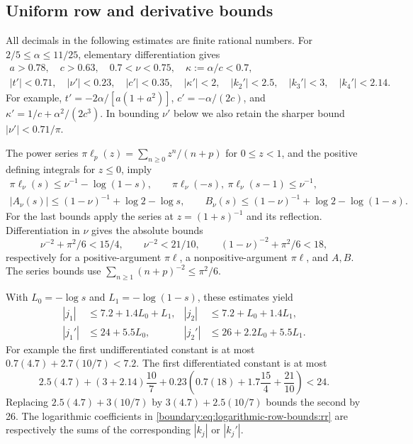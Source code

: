 \subsection{Uniform row and derivative bounds}

All decimals in the following estimates are finite rational numbers.
For $2/5\le\alpha\le11/25$, elementary differentiation gives
\begin{gather*}
 a>0.78,\quad c>0.63,\quad 0.7<\nu<0.75,\quad
 \kappa:=\alpha/c<0.7,\\
 |t'|<0.71,\quad |\nu'|<0.23,\quad |c'|<0.35,\quad
 |\kappa'|<2,\quad |k_2'|<2.5,\quad |k_3'|<3,\quad |k_4'|<2.14.
\end{gather*}
For example,
$t'=-2\alpha/[a(1+a^2)]$, $c'=-\alpha/(2c)$, and
$\kappa'=1/c+\alpha^2/(2c^3)$.  In bounding $\nu'$ below we also
retain the sharper bound $|\nu'|<0.71/\pi$.

The power series
$\pi\ell_p(z)=\sum_{n\ge0}z^n/(n+p)$ for $0\le z<1$, and the
positive defining integrals for $z\le0$, imply
\begin{gather*}
 \pi\ell_\nu(s)\le\nu^{-1}-\log(1-s),\qquad
 \pi\ell_\nu(-s),\ \pi\ell_\nu(s-1)\le\nu^{-1},\\
 |A_\nu(s)|\le(1-\nu)^{-1}+\log2-\log s,\qquad
 B_\nu(s)\le(1-\nu)^{-1}+\log2-\log(1-s).
\end{gather*}
For the last bounds apply the series at $z=(1+s)^{-1}$ and its
reflection.  Differentiation in $\nu$ gives the absolute bounds
\[
 \nu^{-2}+\pi^2/6<15/4,\qquad \nu^{-2}<21/10,
 \qquad (1-\nu)^{-2}+\pi^2/6<18,
\]
respectively for a positive-argument $\pi\ell$, a nonpositive-argument
$\pi\ell$, and $A,B$.  The series bounds use
$\sum_{n\ge1}(n+p)^{-2}\le\pi^2/6$.

With $L_0=-\log s$ and $L_1=-\log(1-s)$, these estimates yield
\begin{align}
 |j_1|&\le7.2+1.4L_0+L_1,&
 |j_2|&\le7.2+L_0+1.4L_1,\nonumber\\
 |j_1'|&\le24+5.5L_0,&
 |j_2'|&\le26+2.2L_0+5.5L_1.
 \label{boundary:eq:logarithmic-row-bounds:rr}
\end{align}
For example the first undifferentiated constant is at most
$0.7(4.7)+2.7(10/7)<7.2$.  The first differentiated constant is at most
\[
 2.5(4.7)+(3+2.14)\frac{10}{7}
 +0.23\left(0.7(18)+1.7\frac{15}{4}+\frac{21}{10}\right)<24.
\]
Replacing $2.5(4.7)+3(10/7)$ by $3(4.7)+2.5(10/7)$ bounds the
second by 26.  The logarithmic coefficients in
\eqref{boundary:eq:logarithmic-row-bounds:rr} are respectively the
sums of the corresponding $|k_j|$ or $|k_j'|$.

